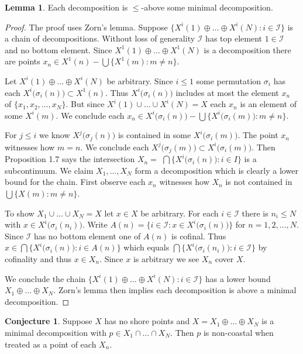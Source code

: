 \documentclass[12pt]{article}
\theoremstyle{plain}
\theoremstyle{definition}
\newtheorem{lemma}[theorem]{Lemma}
\newcounter{dummy}
\newcounter{dummy4}
\newcounter{dummy3}
\newtheorem{cnj3}[dummy3]{Conjecture}
\newcounter{dummy5}
\newcounter{claim5counter}
\newcounter{dummy6}
\newcommand{\si}{\ensuremath{\sigma}}
\newcommand{\0}{\ensuremath{\varnothing}}
\newcommand{\cI}{\ensuremath{\mathcal I}}
\begin{document}
\begin{lemma}
Each decomposition is $\le$-above some minimal decomposition.
\end{lemma}

\begin{proof}
The proof uses Zorn's lemma.
Suppose $\{X^i(1)  \oplus \ldots \oplus X^i(N): i \in \cI\}$ is a chain of decompositions.
Without loss of generality $\cI$ has top element $1 \in \cI$ and no bottom element.
Since $X^1(1)  \oplus \ldots \oplus X^1(N)$ is a decomposition there are points $x_n \in X^1(n) - \bigcup \{X^1(m):m \ne n\}$.

Let $X^i(1)  \oplus \ldots \oplus X^i(N)$ be arbitrary.
Since $i \le 1$ some permutation $\si_i$ has each $X^i \big (\si_i(n) \big ) \subset X^1 (n)$.
Thus $X^i \big (\si_i(n) \big )$ includes at most the element $x_{n}$ of $ \{x_1,x_2,\ldots,x_N\}$.
But since $X^i(1)  \cup \ldots \cup X^i(N) = X $ each $x_n$ is an element of some $X^i(m)$.
We conclude each $x_{n} \in X^i \big (\si_i(n) \big ) - \bigcup \big \{  X^i \big (\si_i(m) \big ) : m \ne n\big \}$.

For $j \le i$ we know $X^j \big (\si_j(n) \big )$ is contained in some $X^i \big (\si_i(m) \big )$.
The point $x_n$ witnesses how $m=n$.
We conclude each $X^j \big (\si_j(m) \big ) \subset X^i \big (\si_i(m) \big )$.
Then \cite{nadlerbook} Proposition 1.7 says the intersection $X_n =$ $\bigcap \big \{ X^i\big (\si_i(n)\big ):i \in I \big \}$ is a subcontinuum.
We claim $X_1, \ldots ,X_N$ form a decomposition which is clearly a lower bound for the chain.
First observe each $x_n$ witnesses how $X_n$ is not contained in $\bigcup \{X(m):m \ne n\}$.

To show $X_1 \cup \ldots \cup X_N = X$ let $x \in X$ be arbitrary.
For each $i \in \cI$ there is $n_i \le N$ with $x \in X^i\big (\si_i(n_i)\big )$.
Write $A(n) = \big \{i \in \cI: x \in X^i\big (\si_i(n)\big )\big \}$ for $n=1,2,\ldots, N$.
Since $\cI$ has no bottom element one of $A(n)$ is cofinal.
Thus $x \in \bigcap \big \{X^i\big (\si_i(n)\big ):i \in A(n)\big \}$ which equals $ 
\bigcap \big \{X^i\big (\si_i(n_i)\big ):i \in \cI\big \} $ by cofinality and thus $x \in X_n$.
Since $x$ is arbitrary we see $X_n$ cover $X$.

We conclude the chain $\{X^i(1)  \oplus \ldots \oplus X^i(N): i \in \cI\}$ has a lower bound $X_1 \oplus\ldots \oplus X_N$.
Zorn's lemma then implies each decomposition is above a minimal decomposition.
\end{proof}


\begin{cnj3}
Suppose $X$ has no shore points and $X = X_1  \oplus \ldots \oplus X_N$ 
is a minimal decomposition with $p \in X_1 \cap \ldots \cap X_N$.
Then $p$ is non-coastal when treated as a point of each $X_n$.
\end{cnj3}
\end{document}
